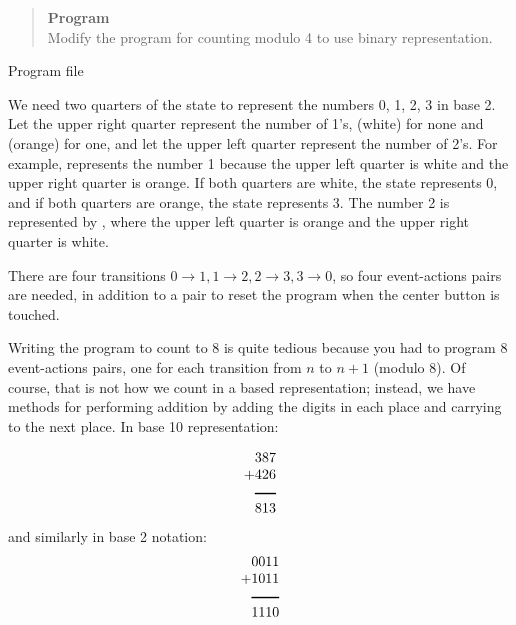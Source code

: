 \begin{quote}
\textbf{Program}\\
Modify the program for counting modulo 4 to use binary representation.
\end{quote}

{\raggedleft \hfill Program file }

We need two quarters of the state to represent the numbers 0, 1, 2, 3 in
base 2. Let the upper right quarter represent the number of 1's,
 (white) for none and  (orange) for one, and let the
upper left quarter represent the number of 2's. For example,
 represents the number 1 because the upper left
quarter is white and the upper right quarter is orange. If both quarters
are white, the state represents 0, and if both quarters are orange, the
state represents 3. The number 2 is represented by ,
where the upper left quarter is orange and the upper right quarter is
white.

There are four transitions $0\rightarrow 1, 1\rightarrow 2, 2
\rightarrow 3, 3\rightarrow 0$, so four event-actions pairs are needed,
in addition to a pair to reset the program when the center button is
touched.

\bigskip


\bigskip




Writing the program to count to 8 is quite tedious because you had to
program 8 event-actions pairs, one for each transition from $n$ to $n+1$
(modulo 8). Of course, that is not how we count in a based
representation; instead, we have methods for performing addition by
adding the digits in each place and carrying to the next place. In base
10 representation:

\begin{displaymath}
\begin{array}{r}
387\\
+426\\
\rule[1pt]{1.5em}{1pt}\\
813\\
\end{array}
\end{displaymath}
and similarly in base 2 notation:
\begin{displaymath}
\begin{array}{r}
0011\\
+1011\\
\rule[1pt]{2em}{1pt}\\
1110\\
\end{array}
\end{displaymath}

